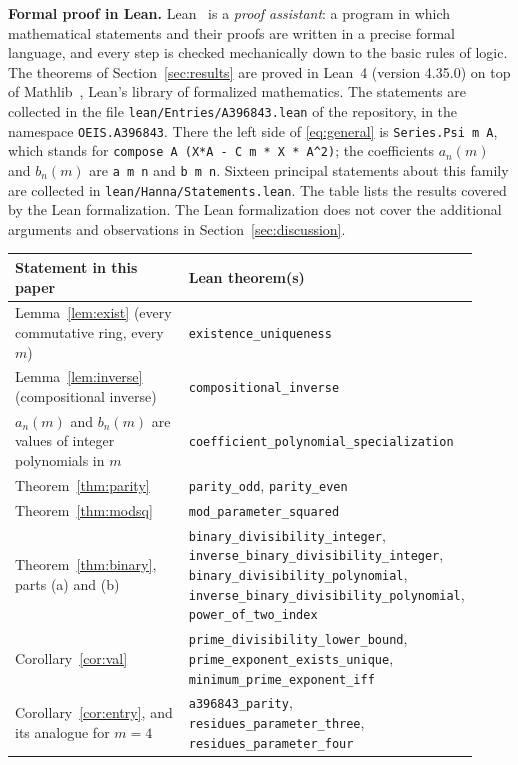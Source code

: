 \documentclass[11pt,a4paper]{article}
\theoremstyle{definition}
\theoremstyle{remark}
\newcommand{\para}[1]{\par\medskip\noindent\textbf{#1}\enspace}
\begin{document}
\para{Formal proof in Lean.}
Lean~\cite{lean} is a \emph{proof assistant}: a program in which mathematical statements and their proofs are written
in a precise formal language, and every step is checked mechanically down to the basic rules of logic. The theorems of Section~\ref{sec:results} are proved in Lean~4 (version 4.35.0) on top of
Mathlib~\cite{mathlib}, Lean's library of formalized mathematics. The statements are collected in the file \texttt{lean/Entries/A396843.lean} of the repository,
in the namespace \texttt{OEIS.A396843}. There the left side of \eqref{eq:general} is \texttt{Series.Psi m A}, which stands for
\texttt{compose A (X*A - C m * X * A\^{}2)}; the coefficients $a_n(m)$ and $b_n(m)$ are \texttt{a m n} and
\texttt{b m n}. Sixteen principal statements about this family are collected in
\texttt{lean/Hanna/Statements.lean}.
The table lists the results covered by the Lean formalization. The Lean formalization does not cover the additional arguments and observations in Section~\ref{sec:discussion}.
\begin{center}\small\renewcommand{\arraystretch}{1.25}
\begin{tabular}{>{\raggedright\arraybackslash}p{0.52\linewidth}>{\raggedright\arraybackslash}p{0.4\linewidth}}
\toprule
Statement in this paper & Lean theorem(s)\\
\midrule
Lemma~\ref{lem:exist} (every commutative ring, every $m$) & \texttt{existence\_\allowbreak{}uniqueness} \\
Lemma~\ref{lem:inverse} (compositional inverse) & \texttt{compositional\_\allowbreak{}inverse} \\
$a_n(m)$ and $b_n(m)$ are values of integer polynomials in $m$ & \texttt{coefficient\_\allowbreak{}polynomial\_\allowbreak{}specialization} \\
Theorem~\ref{thm:parity} & \texttt{parity\_\allowbreak{}odd}, \texttt{parity\_\allowbreak{}even} \\
Theorem~\ref{thm:modsq} & \texttt{mod\_\allowbreak{}parameter\_\allowbreak{}squared} \\
Theorem~\ref{thm:binary}, parts (a) and (b) & \texttt{binary\_\allowbreak{}divisibility\_\allowbreak{}integer}, \texttt{inverse\_\allowbreak{}binary\_\allowbreak{}divisibility\_\allowbreak{}integer}, \texttt{binary\_\allowbreak{}divisibility\_\allowbreak{}polynomial}, \texttt{inverse\_\allowbreak{}binary\_\allowbreak{}divisibility\_\allowbreak{}polynomial}, \texttt{power\_\allowbreak{}of\_\allowbreak{}two\_\allowbreak{}index} \\
Corollary~\ref{cor:val} & \texttt{prime\_\allowbreak{}divisibility\_\allowbreak{}lower\_\allowbreak{}bound}, \texttt{prime\_\allowbreak{}exponent\_\allowbreak{}exists\_\allowbreak{}unique}, \texttt{minimum\_\allowbreak{}prime\_\allowbreak{}exponent\_\allowbreak{}iff} \\
Corollary~\ref{cor:entry}, and its analogue for $m=4$ & \texttt{a396843\_\allowbreak{}parity}, \texttt{residues\_\allowbreak{}parameter\_\allowbreak{}three}, \texttt{residues\_\allowbreak{}parameter\_\allowbreak{}four} \\
\bottomrule
\end{tabular}
\end{center}
\end{document}
